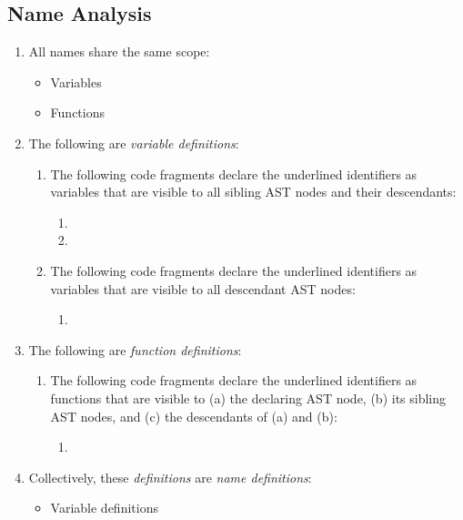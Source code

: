 \subsection{Name Analysis}
\begin{enumerate}
  \item All names share the same scope:
    \begin{itemize}
    \item Variables
    \item Functions
    \end{itemize}
  \item The following are \emph{variable definitions}:
    \begin{enumerate}
    \item The following code fragments declare the underlined identifiers as variables that are visible to all sibling AST nodes and their descendants:
      \begin{enumerate}
      \item {}
      \item {}
      \end{enumerate}
    \item The following code fragments declare the underlined identifiers as variables that are visible to all descendant AST nodes:
      \begin{enumerate}
      \item {}
      \end{enumerate}
    \end{enumerate}
  \item The following are \emph{function definitions}:
    \begin{enumerate}
    \item The following code fragments declare the underlined identifiers as functions that are visible to (a) the declaring AST node, (b) its sibling AST nodes, and (c) the descendants of (a) and (b):
      \begin{enumerate}
      \item {}
      \end{enumerate}
    \end{enumerate}
  \item Collectively, these \emph{definitions} are \emph{name definitions}:
    \begin{itemize}
    \item Variable definitions

\end{itemize}
\end{enumerate}
